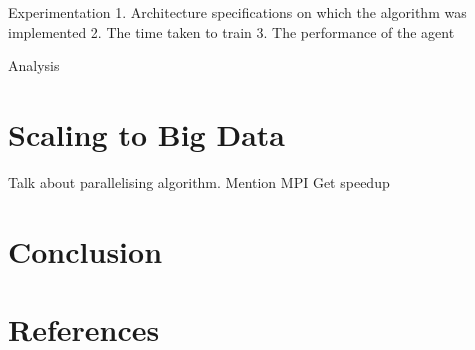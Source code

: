 \documentclass{article}
\begin{document}
    Experimentation
        1. Architecture specifications on which the algorithm was implemented
        2. The time taken to train
        3. The performance of the agent

    Analysis

    \section{Scaling to Big Data}

    Talk about parallelising algorithm. Mention MPI
    Get speedup

    \section{Conclusion}

    \section{References}
\end{document}
